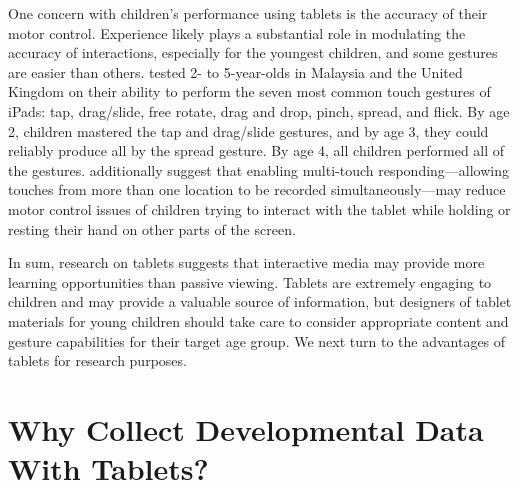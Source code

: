 \documentclass[man,noapacite]{apa2}
\begin{document}

One concern with children's performance using tablets is the accuracy of their motor control. Experience likely plays a substantial role in modulating the accuracy of interactions, especially for the youngest children, and some gestures are easier than others.  tested 2- to 5-year-olds in Malaysia and the United Kingdom on their ability to perform the seven most common touch gestures of iPads: tap, drag/slide, free rotate, drag and drop, pinch, spread, and flick. By age 2, children mastered the tap and drag/slide gestures, and by age 3, they could reliably produce all by the spread gesture. By age 4, all children performed all of the gestures.  additionally suggest that enabling multi-touch responding---allowing touches from more than one location to be recorded simultaneously---may reduce motor control issues of children trying to interact with the tablet while holding or resting their hand on other parts of the screen. 


 

In sum, research on tablets suggests that interactive media may provide more learning opportunities than passive viewing. Tablets are extremely engaging to children and may provide a valuable source of information, but designers of tablet materials for young children should take care to consider appropriate content and gesture capabilities for their target age group. We next turn to the advantages of tablets for research purposes.


\section{Why Collect Developmental Data With Tablets?}
\end{document}
